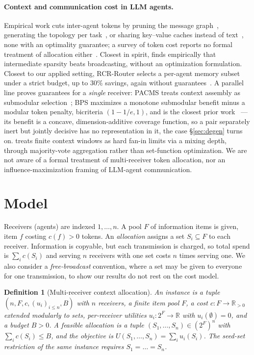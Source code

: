 \documentclass[sigconf,anonymous]{aamas}
\newtheorem{definition}{Definition}
\theoremstyle{remark}
\begin{document}
\paragraph{Context and communication cost in LLM agents.} Empirical
work cuts inter-agent tokens by pruning the message
graph~\cite{agentprune2024}, generating the topology per
task~\cite{gtd2026,todycomm2026}, or sharing key--value caches instead
of text~\cite{kvcomm2026}, none with an optimality guarantee; a survey
of token cost reports no formal treatment of allocation
either~\cite{tokenecon2026}. Closest in spirit, \cite{propagation2025}
finds empirically that intermediate sparsity beats broadcasting,
without an optimization formulation. Closest to our applied setting,
RCR-Router selects a per-agent memory subset under a strict budget, up
to $30\%$ savings, again without guarantees~\cite{rcrrouter2025}. A
parallel line proves guarantees for a \emph{single} receiver: PACMS
treats context assembly as submodular selection~\cite{pacms2026}; BPS
maximizes a monotone submodular benefit minus a modular token penalty,
bicriteria $(1-1/e,1)$, and is the closest prior work~\cite{bps2026}
--- its benefit is a concave, dimension-additive coverage function, so
a pair separately inert but jointly decisive has no representation in
it, the case \S\ref{sec:degen} turns on. \cite{phasetransition2026}
treats finite context windows as hard fan-in limits via a mixing
depth, through majority-vote aggregation rather than set-function
optimization. We are not aware of a formal treatment of multi-receiver
token allocation, nor an influence-maximization framing of LLM-agent
communication.

\section{Model}
\label{sec:model}

Receivers (agents) are indexed $1,\dots,n$. A pool $F$ of information
items is given, item $f$ costing $c(f)>0$ tokens. An
\emph{allocation} assigns a set $S_i \subseteq F$ to each receiver.
Information is copyable, but each transmission is charged, so total
spend is $\sum_i c(S_i)$ and serving $n$ receivers with one set costs
$n$ times serving one. We also consider a \emph{free-broadcast}
convention, where a set may be given to everyone for one transmission,
to show our results do not rest on the cost model.

\begin{definition}[Multi-receiver context allocation]
\label{def:prob}
An instance is a tuple $(n, F, c, (u_i)_{i\le n}, B)$ with $n$
receivers, a finite item pool $F$, a cost $c: F \to \mathbb{R}_{>0}$
extended modularly to sets, per-receiver utilities
$u_i : 2^{F} \to \mathbb{R}$ with $u_i(\emptyset)=0$, and a budget
$B>0$. A feasible \emph{allocation} is a tuple
$(S_1,\dots,S_n) \in (2^{F})^{n}$ with $\sum_i c(S_i) \le B$, and the
objective is $U(S_1,\dots,S_n) = \sum_i u_i(S_i)$. The
\emph{seed-set restriction} of the same instance requires
$S_1 = \dots = S_n$.
\end{definition}
\end{document}
